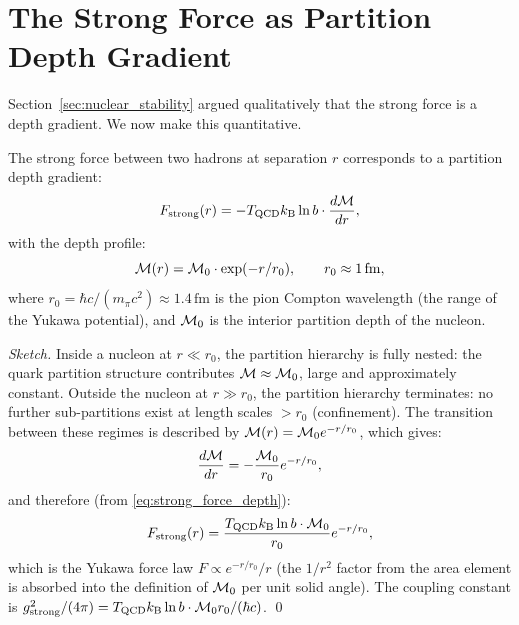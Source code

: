 \section{The Strong Force as Partition Depth Gradient}
\label{sec:strong_force_gradient}

Section~\ref{sec:nuclear_stability} argued qualitatively that the strong force
is a depth gradient. We now make this quantitative.

\begin{proposition}
\label{prop:strong_force}
The strong force between two hadrons at separation $r$ corresponds to a
partition depth gradient:
\begin{equation}
  F_{\mathrm{strong}}(r) = -T_{\mathrm{QCD}} k_{\mathrm{B}} \ln b \cdot \frac{d\mathcal{M}}{dr},
  \label{eq:strong_force_depth}
\end{equation}
with the depth profile:
\begin{equation}
  \mathcal{M}(r) = \mathcal{M}_0 \cdot \exp(-r/r_0), \qquad r_0 \approx 1\,\mathrm{fm},
  \label{eq:depth_profile}
\end{equation}
where $r_0 = \hbar c / (m_\pi c^2) \approx 1.4\,\mathrm{fm}$ is the pion Compton
wavelength (the range of the Yukawa potential), and $\mathcal{M}_0$ is the interior
partition depth of the nucleon.
\end{proposition}

\begin{proof}[Sketch]
Inside a nucleon at $r \ll r_0$, the partition hierarchy is fully nested:
the quark partition structure contributes $\mathcal{M} \approx \mathcal{M}_0$, large
and approximately constant. Outside the nucleon at $r \gg r_0$, the partition
hierarchy terminates: no further sub-partitions exist at length scales
$> r_0$ (confinement). The transition between these regimes is described by
$\mathcal{M}(r) = \mathcal{M}_0 e^{-r/r_0}$, which gives:
\begin{equation}
  \frac{d\mathcal{M}}{dr} = -\frac{\mathcal{M}_0}{r_0} e^{-r/r_0},
\end{equation}
and therefore (from \eqref{eq:strong_force_depth}):
\begin{equation}
  F_{\mathrm{strong}}(r) = \frac{T_{\mathrm{QCD}} k_{\mathrm{B}} \ln b \cdot \mathcal{M}_0}{r_0} e^{-r/r_0},
\end{equation}
which is the Yukawa force law $F \propto e^{-r/r_0}/r$ (the $1/r^2$ factor
from the area element is absorbed into the definition of $\mathcal{M}_0$ per unit
solid angle). The coupling constant is $g_{\mathrm{strong}}^2 / (4\pi) =
T_{\mathrm{QCD}} k_{\mathrm{B}} \ln b \cdot \mathcal{M}_0 r_0 / (\hbar c)$. \qed
\end{proof}

